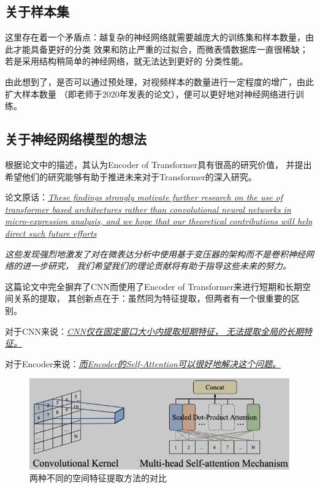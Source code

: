 \documentclass[AutoFakeBold]{MyFormat}
\begin{document}
\subsection{关于样本集}
\par 这里存在着一个矛盾点：越复杂的神经网络就需要越庞大的训练集和样本数量，由此才能具备更好的分类
效果和防止严重的过拟合，而微表情数据库一直很稀缺；若是采用结构稍简单的神经网络，就无法达到更好的
分类性能。
\par 由此想到了，是否可以通过预处理，对视频样本的数量进行一定程度的增广，由此扩大样本数量
（即老师于2020年发表的论文），便可以更好地对神经网络进行训练。

\subsection{关于神经网络模型的想法}
\par 根据论文中的描述，其认为Encoder of Transformer具有很高的研究价值，
并提出希望他们的研究能够有助于推进未来对于Transformer的深入研究。
\par 论文原话：\textit{\uline{These findings strongly
motivate further research on the use of transformer based
architectures rather than convolutional neural networks in
micro-expression analysis, and we hope that our theoretical
contributions will help direct such future efforts}}
\par \textit{这些发现强烈地激发了对在微表达分析中使用基于变压器的架构而不是卷积神经网络的进一步研究，
我们希望我们的理论贡献将有助于指导这些未来的努力。}
\par 这篇论文中完全摒弃了CNN而使用了Encoder of Transformer来进行短期和长期空间关系的提取，
其创新点在于：虽然同为特征提取，但两者有一个很重要的区别。
\par 对于CNN来说：\textit{\uline{CNN仅在固定窗口大小内提取短期特征，
无法提取全局的长期特征。}}
\par 对于Encoder来说：\textit{\uline{而Encoder的Self-Attention可以很好地解决这个问题。}}
\begin{figure}[!h]
    \centering
    \includegraphics[width=0.9\linewidth]{figures/MyReflections/1.png}
    \caption{两种不同的空间特征提取方法的对比}
\end{figure}
\end{document}
